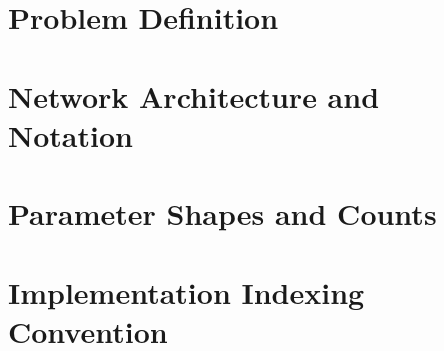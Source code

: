 \documentclass{article}
\begin{document}
\section{Problem Definition}

%

\section{Network Architecture and Notation}

%
%


\section{Parameter Shapes and Counts}

%
%
%


\section{Implementation Indexing Convention}

%
%
%
\end{document}

